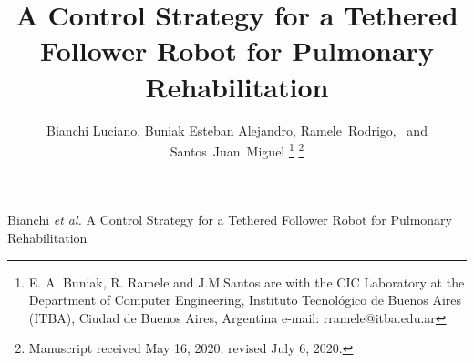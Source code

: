 \documentclass[journal]{IEEEtran}
\begin{document}
%
\title{A Control Strategy for a Tethered Follower Robot for Pulmonary Rehabilitation}
%
%
%

\author{Bianchi Luciano, Buniak Esteban Alejandro, Ramele~Rodrigo,~
        and Santos~Juan~Miguel%
\thanks{E. A. Buniak, R. Ramele  and J.M.Santos are with the CIC Laboratory at the Department
of  Computer Engineering, Instituto Tecnológico de Buenos Aires (ITBA), Ciudad de Buenos Aires,  Argentina e-mail: rramele@itba.edu.ar}%
\thanks{Manuscript received May 16, 2020; revised July 6, 2020.}}

% 
%



%
{Bianchi \MakeLowercase{\textit{et al.}} A Control Strategy for a Tethered Follower Robot
for Pulmonary Rehabilitation}
% 
\end{document}
